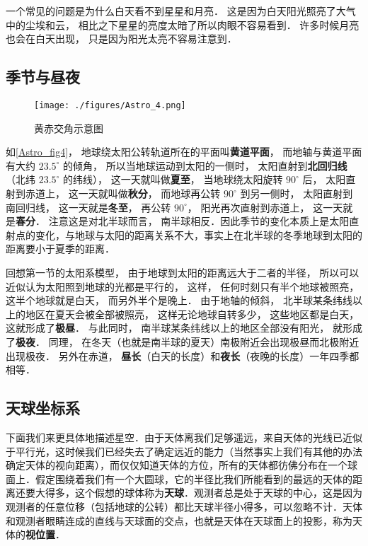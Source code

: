 一个常见的问题是为什么白天看不到星星和月亮． 这是因为白天阳光照亮了大气中的尘埃和云， 相比之下星星的亮度太暗了所以肉眼不容易看到． 许多时候月亮也会在白天出现， 只是因为阳光太亮不容易注意到．

\subsection{季节与昼夜}

\begin{figure}[ht]
\centering
\texttt{[image: ./figures/Astro\_4.png]}
\caption{黄赤交角示意图} \label{Astro_fig4}
\end{figure}

如\autoref{Astro_fig4}， 地球绕太阳公转轨道所在的平面叫\textbf{黄道平面}， 而地轴与黄道平面有大约 $23.5^\circ$ 的倾角， 所以当地球运动到太阳的一侧时， 太阳直射到\textbf{北回归线}（北纬 $23.5^\circ$ 的纬线）， 这一天就叫做\textbf{夏至}， 当地球绕太阳旋转 $90^\circ$ 后， 太阳直射到赤道上， 这一天就叫做\textbf{秋分}， 而地球再公转 $90^\circ$ 到另一侧时， 太阳直射到南回归线， 这一天就是\textbf{冬至}， 再公转 $90^\circ$， 阳光再次直射到赤道上， 这一天就是\textbf{春分}． 注意这是对北半球而言， 南半球相反．因此季节的变化本质上是太阳直射点的变化，与地球与太阳的距离关系不大，事实上在北半球的冬季地球到太阳的距离要小于夏季的距离． 

回想第一节的太阳系模型， 由于地球到太阳的距离远大于二者的半径， 所以可以近似认为太阳照到地球的光都是平行的， %
这样， 任何时刻只有半个地球被照亮， 这半个地球就是白天， 而另外半个是晚上． 由于地轴的倾斜， 北半球某条纬线以上的地区在夏天会被全部被照亮， 这样无论地球自转多少， 这些地区都是白天， 这就形成了\textbf{极昼}． 与此同时， 南半球某条纬线以上的地区全部没有阳光， 就形成了\textbf{极夜}． 同理， 在冬天（也就是南半球的夏天）南极附近会出现极昼而北极附近出现极夜． 另外在赤道， \textbf{昼长}（白天的长度）和\textbf{夜长}（夜晚的长度）一年四季都相等．

\subsection{天球坐标系}

下面我们来更具体地描述星空．由于天体离我们足够遥远，来自天体的光线已近似于平行光，这时候我们已经失去了确定远近的能力（当然事实上我们有其他的办法确定天体的视向距离），而仅仅知道天体的方位，所有的天体都彷佛分布在一个球面上．假定围绕着我们有一个大圆球，它的半径比我们所能看到的最远的天体的距离还要大得多，这个假想的球体称为\textbf{天球}．观测者总是处于天球的中心，这是因为观测者的任意位移（包括地球的公转）都比天球半径小得多，可以忽略不计．天体和观测者眼睛连成的直线与天球面的交点，也就是天体在天球面上的投影，称为天体的\textbf{视位置}．

